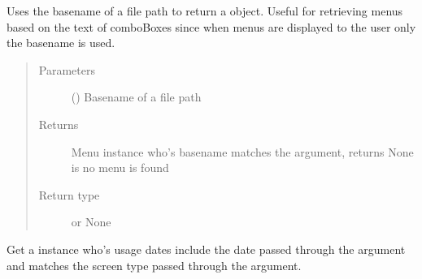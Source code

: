 \documentclass[letterpaper,10pt,english]{sphinxmanual}
\begin{document}
\begin{fulllineitems}
\begin{fulllineitems}
\label{\detokenize{polo.utils:polo.utils.io_utils.BarTender.get_menu_by_basename}}
Uses the basename of a {\hyperref[\detokenize{polo.utils:polo.utils.io_utils.Menu}]{}} file path to return a {\hyperref[\detokenize{polo.utils:polo.utils.io_utils.Menu}]{}} object.
Useful for retrieving menus based on the text of comboBoxes since
when menus are displayed to the user only the basename is used.
\begin{quote}\begin{description}
\item[{Parameters}] \leavevmode
{} () \textendash{} Basename of a {\hyperref[\detokenize{polo.utils:polo.utils.io_utils.Menu}]{}} file path

\item[{Returns}] \leavevmode
Menu instance who’s basename matches the  argument,
returns None is no menu is found

\item[{Return type}] \leavevmode
{\hyperref[\detokenize{polo.utils:polo.utils.io_utils.Menu}]{}} or None

\end{description}\end{quote}

\end{fulllineitems}


\begin{fulllineitems}
\label{\detokenize{polo.utils:polo.utils.io_utils.BarTender.get_menu_by_date}}
Get a {\hyperref[\detokenize{polo.utils:polo.utils.io_utils.Menu}]{}} instance who’s usage dates include the
date passed through the  argument and
matches the screen type passed through the  argument.


\end{fulllineitems}
\end{fulllineitems}
\end{document}

